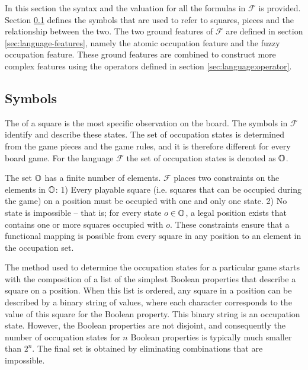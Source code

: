 In this section the syntax and the valuation for all the formulas in $\mathcal{F}$ is provided.  Section \ref{sec:language-symbol} defines the symbols that are used to refer to squares, pieces and the relationship between the two. The two ground features of $\mathcal{F}$ are defined in section  \ref{sec:language-features}, namely the atomic occupation feature and the fuzzy occupation feature.  These ground features are combined to construct more complex features using the operators defined in section \ref{sec:language:operator}.  

\subsection{Symbols}
\label{sec:language-symbol}
The  of a square is the most specific observation on the board. The symbols in $\mathcal{F}$ identify and describe these states. The set of occupation states is determined from the game pieces and the game rules, and it is therefore different for every board game.  For the language $\mathcal{F}$ the set of occupation states is denoted as $\mathbb{O}$.  

The set $\mathbb{O}$ has a finite number of elements. $\mathcal{F}$ places two constraints on the elements in $\mathbb{O}$: 1) Every playable square (i.e. squares that can be occupied during the game) on a position must be occupied with one and only one state. 2) No state is impossible -- that is; for every state $o \in \mathbb{O}$, a legal position exists that contains one or more squares occupied with $o$.  These constraints ensure that a functional mapping is possible from every square in any position to an element in the occupation set.

The method used to determine the occupation states for a particular game starts with the composition of a list of the simplest Boolean properties that describe a square on a position.  When this list is ordered, any square in a position can be described by a binary string of values, where each character corresponds to the value of this square for the Boolean property.  This binary string is an occupation state.  However, the Boolean properties are not disjoint, and consequently the number of occupation states for $n$ Boolean properties is typically much smaller than $2^n$.  The final set is obtained by eliminating combinations that are impossible.

